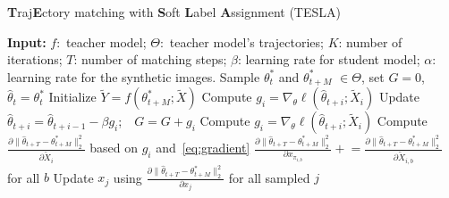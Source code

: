 \documentclass[10pt,twocolumn,letterpaper]{article}
\begin{document}
\begin{algorithm}
\caption{\textbf{T}raj\textbf{E}ctory matching with \textbf{S}oft \textbf{L}abel \textbf{A}ssignment (TESLA)}
\label{alg:algorithm}
\begin{algorithmic}
\State \textbf{Input:} $f:$ teacher model; $\Theta:$ teacher model's trajectories; $K$: number of iterations; $T$: number of matching steps; $\beta$: learning rate for student model; $\alpha$: learning rate for the synthetic images.
 \State Sample $\theta_{t}^*$ and $\theta_{t+M}^*$ $\in\Theta$, set $G=0$, $\hat{\theta}_t=\theta_t^*$
 \State Initialize $\tilde{Y}=f(\theta_{t+M}^*;\tilde{X})$ 
\State Compute $g_i = \nabla_\theta \ell(\hat{\theta}_{t+i};\tilde{X}_i)$
\State Update $\hat{\theta}_{t+i} = \hat{\theta}_{t+i-1} - \beta g_i$;\ \  $G = G + g_i$
\EndFor
{}
\State Compute $ g_i = \nabla_\theta \ell(\hat{\theta}_{t+i};\tilde{X}_i)$
\State Compute
$\frac{\partial \|\hat{\theta}_{t+T}-\theta^*_{t+M}\|_2^2}{\partial \tilde{X}_i}$ based on 
$g_i$ and~\cref{eq:gradient}
\State $\frac{\partial \|\hat{\theta}_{t+T}-\theta^*_{t+M}\|_2^2}{\partial x_{\pi_{i,b}}} +\!\!=\! \frac{\partial \|\hat{\theta}_{t+T}-\theta^*_{t+M}\|_2^2}{\partial \tilde{X}_{i,b}}$  for all $b$
%
\EndFor
\State Update $x_j$ using $\frac{\partial \|\hat{\theta}_{t+T}-\theta^*_{t+M}\|_2^2}{\partial x_{j}}$ for all sampled $j$
\EndFor
\end{algorithmic}
\end{algorithm}
\end{document}
